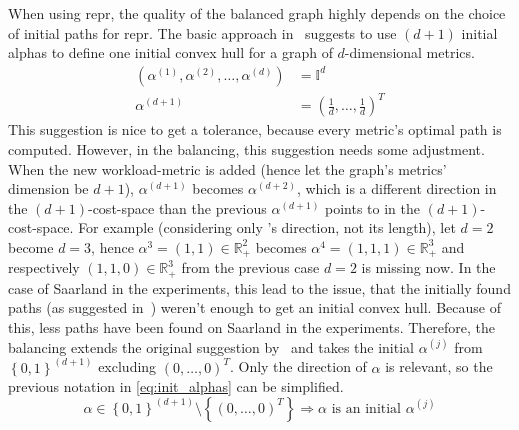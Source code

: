         When using \gls{repr}, the quality of the balanced graph highly depends on the choice of initial paths for \gls{repr}.
        The basic approach in~\cite{barth:alternative_multicriteria_routes} suggests to use $(d+1)$ initial alphas to define one initial convex hull for a graph of $d$-dimensional metrics.
        \begin{equation}
        \label{eq:init_alphas}
        \begin{aligned}
            \left( \alpha^{(1)}, \alpha^{(2)}, \dots, \alpha^{(d)} \right) &= \mathbb{I}^d\\
            \alpha^{(d+1)} &= \left( \frac{1}{d}, \dots, \frac{1}{d} \right)^T
        \end{aligned}
        \end{equation}
        This suggestion is nice to get a tolerance, because every metric's optimal path is computed.
        However, in the balancing, this suggestion needs some adjustment.
        When the new workload-metric is added (hence let the graph's metrics' dimension be $d+1$), $\alpha^{(d+1)}$ becomes $\alpha^{(d+2)}$, which is a different direction in the $(d+1)$-cost-space than the previous $\alpha^{(d+1)}$ points to in the $(d+1)$-cost-space.
        For example (considering only \alpha's direction, not its length), let $d=2$ become $d=3$, hence $\alpha^3=(1, 1) \in \mathbb{R}_+^2$ becomes $\alpha^4=(1, 1, 1) \in \mathbb{R}_+^3$ and respectively $(1, 1, 0) \in \mathbb{R}_+^3$ from the previous case $d=2$ is missing now.
        In the case of Saarland in the experiments, this lead to the issue, that the initially found paths (as suggested in~\cite{barth:alternative_multicriteria_routes}) weren't enough to get an initial convex hull.
        Because of this, less paths have been found on Saarland in the experiments.
        Therefore, the balancing extends the original suggestion by~\cite{barth:alternative_multicriteria_routes} and takes the initial $\alpha^{(j)}$ from $\left\{ 0, 1 \right\}^{(d+1)}$ excluding $(0, \dots, 0)^T$.
        Only the direction of $\alpha$ is relevant, so the previous notation in \cref{eq:init_alphas} can be simplified.
        \begin{equation}
            \label{eq:new_init_alphas}
            \alpha \in \left\{ 0, 1 \right\}^{(d+1)} \setminus \left\{ \left( 0, \dots, 0 \right)^T \right\} \Rightarrow \alpha \text{ is an initial } \alpha^{(j)}
        \end{equation}


